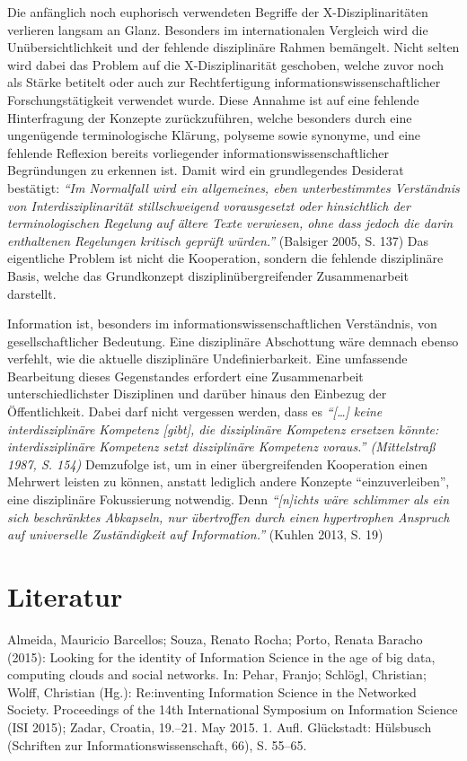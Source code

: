 \documentclass[a4paper,
fontsize=11pt,
oneside,
numbers=noperiodatend,
parskip=half-,
bibliography=totoc,
final
]{scrartcl}
\begin{document}
Die anfänglich noch euphorisch verwendeten Begriffe der
X-Disziplinaritäten verlieren langsam an Glanz. Besonders im
internationalen Vergleich wird die Unübersichtlichkeit und der fehlende
disziplinäre Rahmen bemängelt. Nicht selten wird dabei das Problem auf
die X-Disziplinarität geschoben, welche zuvor noch als Stärke betitelt
oder auch zur Rechtfertigung informationswissenschaftlicher
Forschungstätigkeit verwendet wurde. Diese Annahme ist auf eine fehlende
Hinterfragung der Konzepte zurückzuführen, welche besonders durch eine
ungenügende terminologische Klärung, polyseme sowie synonyme, und eine
fehlende Reflexion bereits vorliegender informationswissenschaftlicher
Begründungen zu erkennen ist. Damit wird ein grundlegendes Desiderat
bestätigt: \emph{\enquote{Im Normalfall wird ein allgemeines, eben
unterbestimmtes Verständnis von Interdisziplinarität stillschweigend
vorausgesetzt oder hinsichtlich der terminologischen Regelung auf ältere
Texte verwiesen, ohne dass jedoch die darin enthaltenen Regelungen
kritisch geprüft würden.}} (Balsiger 2005, S. 137) Das eigentliche
Problem ist nicht die Kooperation, sondern die fehlende disziplinäre
Basis, welche das Grundkonzept disziplinübergreifender Zusammenarbeit
darstellt.

Information ist, besonders im informationswissenschaftlichen
Verständnis, von gesellschaftlicher Bedeutung. Eine disziplinäre
Abschottung wäre demnach ebenso verfehlt, wie die aktuelle disziplinäre
Undefinierbarkeit. Eine umfassende Bearbeitung dieses Gegenstandes
erfordert eine Zusammenarbeit unterschiedlichster Disziplinen und
darüber hinaus den Einbezug der Öffentlichkeit. Dabei darf nicht
vergessen werden, dass es \emph{\enquote{{[}\ldots{}{]} keine
interdisziplinäre Kompetenz {[}gibt{]}, die disziplinäre Kompetenz
ersetzen könnte: interdisziplinäre Kompetenz setzt disziplinäre
Kompetenz voraus.} (Mittelstraß 1987, S. 154)} Demzufolge ist, um in
einer übergreifenden Kooperation einen Mehrwert leisten zu können,
anstatt lediglich andere Konzepte \enquote{einzuverleiben}, eine
disziplinäre Fokussierung notwendig. Denn \emph{\enquote{{[}n{]}ichts
wäre schlimmer als ein sich beschränktes Abkapseln, nur übertroffen
durch einen hypertrophen Anspruch auf universelle Zuständigkeit auf
Information.}} (Kuhlen 2013, S. 19)

\section*{Literatur}\label{literatur}

Almeida, Mauricio Barcellos; Souza, Renato Rocha; Porto, Renata Baracho
(2015): Looking for the identity of Information Science in the age of
big data, computing clouds and social networks. In: Pehar, Franjo;
Schlögl, Christian; Wolff, Christian (Hg.): Re:inventing Information
Science in the Networked Society. Proceedings of the 14th International
Symposium on Information Science (ISI 2015); Zadar, Croatia, 19.--21.
May 2015. 1. Aufl. Glückstadt: Hülsbusch (Schriften zur
Informationswissenschaft, 66), S. 55--65.
\end{document}
